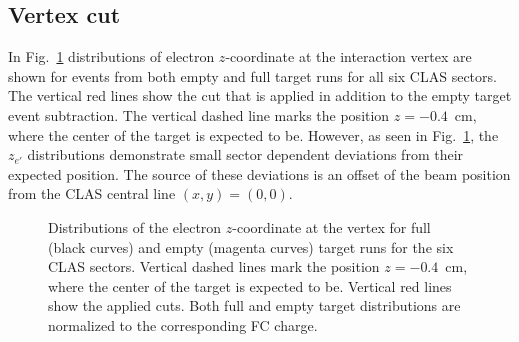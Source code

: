 \subsection{Vertex cut}
\label{Sect:vertex}
\afterpage{\clearpage}


In Fig.~\ref{fig:z_el_full_empty} distributions of electron $z$-coordinate at the interaction vertex are shown for events from both empty and full target runs for all six CLAS sectors. The vertical red lines show the cut that is applied in addition to the empty target event subtraction. The vertical dashed line marks the position $z = -0.4$~cm, where the center of the target is expected to be. However, as seen in Fig.~\ref{fig:z_el_full_empty}, the $z_{e'}$ distributions demonstrate small sector dependent deviations from their expected position. The source of these deviations is an offset of the beam position from the CLAS central line $(x, y) = (0, 0)$. 

\begin{figure}[!ht]
\begin{center}
\end{center}
\caption{\small Distributions of the electron $z$-coordinate at the vertex for full (black curves) and empty (magenta curves) target runs for the six CLAS sectors. Vertical dashed lines mark the position $z = -0.4$~cm, where the center of the target is expected to be. Vertical red lines show the applied cuts. Both full and empty target distributions are normalized to the corresponding FC charge. }
\label{fig:z_el_full_empty}
\end{figure}

